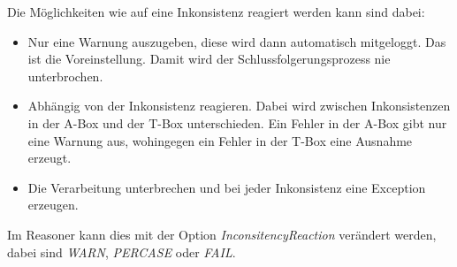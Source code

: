 Die Möglichkeiten wie auf eine Inkonsistenz reagiert werden kann sind dabei:
\begin{itemize}
  \item Nur eine Warnung auszugeben, diese wird dann automatisch mitgeloggt. Das ist die Voreinstellung. Damit wird der Schlussfolgerungsprozess nie unterbrochen.
  \item Abhängig von der Inkonsistenz reagieren. Dabei wird zwischen Inkonsistenzen in der A-Box und der T-Box unterschieden. Ein Fehler in der A-Box gibt nur eine Warnung aus, wohingegen ein Fehler in der T-Box eine Ausnahme erzeugt.
  \item Die Verarbeitung unterbrechen und bei jeder Inkonsistenz eine Exception erzeugen.
\end{itemize}

Im Reasoner kann dies mit der Option \emph{InconsitencyReaction} verändert werden, dabei sind \emph{WARN}, \emph{PERCASE} oder \emph{FAIL}.


